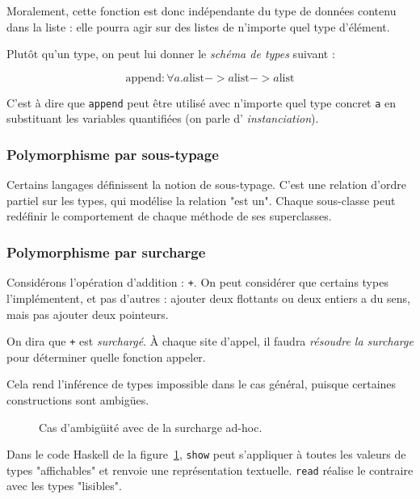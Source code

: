 Moralement, cette fonction est donc indépendante du type de données contenu dans
la liste : elle pourra agir sur des listes de n'importe quel type d'élément.

Plutôt qu'un type, on peut lui donner le \emph{schéma de types} suivant :

\[
  \textrm{append} : \forall a . a \textrm{list}
                             -> a \textrm{list}
                             -> a \textrm{list}
\]

C'est à dire que \texttt{append} peut être utilisé avec n'importe quel type
concret \texttt{a} en substituant les variables quantifiées (on parle d'
\emph{instanciation}).

\subsubsection{Polymorphisme par sous-typage}


Certains langages définissent la notion de sous-typage. C'est une relation
d'ordre partiel sur les types, qui modélise la relation "est un". Chaque
sous-classe peut redéfinir le comportement de chaque méthode de ses
superclasses.

\subsubsection{Polymorphisme par surcharge}

Considérons l'opération d'addition : \texttt{+}. On peut considérer que certains
types l'implémentent, et pas d'autres : ajouter deux flottants ou deux entiers a
du sens, mais pas ajouter deux pointeurs.

On dira que \texttt{+} est \emph{surchargé}. À chaque site d'appel, il faudra
\emph{résoudre la surcharge} pour déterminer quelle fonction appeler.

Cela rend l'inférence de types 
impossible dans le cas général, puisque certaines constructions sont ambigües.

\begin{figure}
  \caption{Cas d'ambigüité avec de la surcharge ad-hoc.}
  \label{fig:showread}
\end{figure}

Dans le code Haskell de la figure~\ref{fig:showread}, \texttt{show} peut
s'appliquer à toutes les valeurs de types "affichables" et renvoie une
représentation textuelle. \texttt{read} réalise le contraire avec les types
"lisibles".

